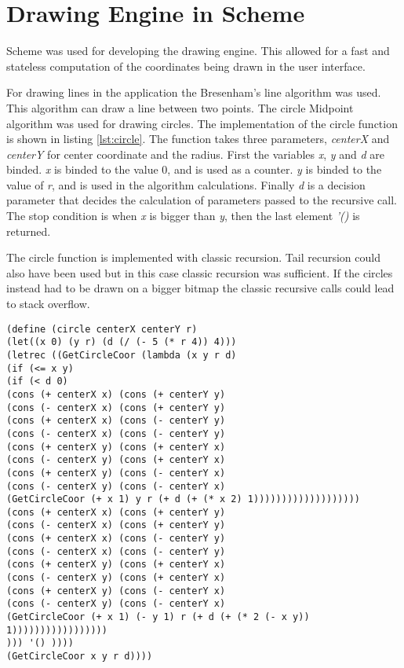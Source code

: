 \section{Drawing Engine in Scheme}
Scheme was used for developing the drawing engine. This allowed for a fast and stateless computation of the coordinates being drawn in the user interface. 

For drawing lines in the application the Bresenham’s line algorithm was used. This algorithm can draw a line between two points. The circle Midpoint algorithm was used for drawing circles. The implementation of the circle function is shown in listing \ref{lst:circle}. The function takes three parameters, \emph{centerX	} and \emph{centerY} for center coordinate and the radius. First the variables \emph{x}, \emph{y} and \emph{d} are binded. \emph{x} is binded to the value 0, and is used as a counter. \emph{y} is binded to the value of \emph{r}, and is used in the algorithm calculations. Finally \emph{d} is  a decision parameter that decides the calculation of parameters passed to the recursive call. The stop condition is when \emph{x} is bigger than \emph{y}, then the last element \emph{'()} is returned.
	
The circle function is implemented with classic recursion. Tail recursion could also have been used but in this case classic recursion was sufficient. If the circles instead had to be drawn on a bigger bitmap the classic recursive calls could lead to stack overflow.

\newpage
\begin{lstlisting}[caption={Scheme function circle}, label=lst:circle]
(define (circle centerX centerY r)
(let((x 0) (y r) (d (/ (- 5 (* r 4)) 4)))
(letrec ((GetCircleCoor (lambda (x y r d)
(if (<= x y)
(if (< d 0)    
(cons (+ centerX x) (cons (+ centerY y)                                                
(cons (- centerX x) (cons (+ centerY y)
(cons (+ centerX x) (cons (- centerY y)         
(cons (- centerX x) (cons (- centerY y)
(cons (+ centerX y) (cons (+ centerY x)
(cons (- centerX y) (cons (+ centerY x)
(cons (+ centerX y) (cons (- centerY x)
(cons (- centerX y) (cons (- centerY x)  
(GetCircleCoor (+ x 1) y r (+ d (+ (* x 2) 1)))))))))))))))))))
(cons (+ centerX x) (cons (+ centerY y)                                                
(cons (- centerX x) (cons (+ centerY y)
(cons (+ centerX x) (cons (- centerY y)         
(cons (- centerX x) (cons (- centerY y)
(cons (+ centerX y) (cons (+ centerY x)
(cons (- centerX y) (cons (+ centerY x)
(cons (+ centerX y) (cons (- centerY x)
(cons (- centerX y) (cons (- centerY x)  
(GetCircleCoor (+ x 1) (- y 1) r (+ d (+ (* 2 (- x y)) 1)))))))))))))))))
))) '() ))))
(GetCircleCoor x y r d))))   
\end{lstlisting}

